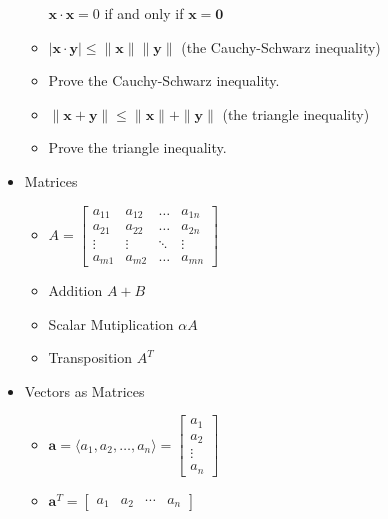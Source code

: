 \documentclass[11pt]{article}
\theoremstyle{plain}
\theoremstyle{definition}
\theoremstyle{remark}
\newcommand{\vect}[1]{\mathbf{#1}}
\newcommand{\<}{\langle}
\renewcommand{\>}{\rangle}
\begin{document}
\begin{itemize}
\begin{itemize}
        \(
          \vect{x}\cdot\vect{x} = 0
        \)
        if and only if
        \(
          \vect{x}=\vect{0}
        \)
      \item
        \(
          |\vect{x}\cdot\vect{y}|
            \leq
          \|\vect{x}\|\|\vect{y}\|
        \)
        (the Cauchy-Schwarz inequality)
      \item Prove the Cauchy-Schwarz inequality.
      \item
        \(
          \|\vect{x}+\vect{y}\|
            \leq
          \|\vect{x}\|+\|\vect{y}\|
        \)
        (the triangle inequality)
      \item Prove the triangle inequality.
    \end{itemize}
  \item Matrices
    \begin{itemize}
      \item
        \(
          A
            =
          \begin{bmatrix}
            a_{11} & a_{12} & \dots  & a_{1n} \\
            a_{21} & a_{22} & \dots  & a_{2n} \\
            \vdots & \vdots & \ddots & \vdots \\
            a_{m1} & a_{m2} & \dots  & a_{mn}
          \end{bmatrix}
        \)
      \item Addition \(A+B\)
      \item Scalar Mutiplication \(\alpha A\)
      \item Transposition \(A^T\)
    \end{itemize}
  \item Vectors as Matrices
    \begin{itemize}
      \item
        \(
          \vect{a}=\<a_1,a_2,\dots,a_n\>
            =
          \begin{bmatrix}
            a_{1}  \\
            a_{2}  \\
            \vdots \\
            a_{n}
          \end{bmatrix}
        \)
      \item
        \(
          \vect{a}^T
            =
          \begin{bmatrix}
            a_{1} & a_{2} & \cdots & a_{n}
          \end{bmatrix}
        \)
    \end{itemize}

\end{itemize}
\end{document}
